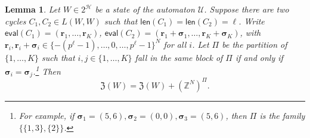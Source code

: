 \documentclass[letterpaper, 11pt, thm-restate]{article}
\numberwithin{equation}{section}
\newcommand{\Z}{\mathbb{Z}}
\newcommand{\mH}{\mathcal{H}}
\newcommand{\mZ}{\mathfrak{Z}}
\newcommand{\br}{\boldsymbol{r}}
\newcommand{\mmU}{\mathscr{U}}
\newcommand{\bsig}{\boldsymbol{\sigma}}
\newcommand{\len}{\mathsf{len}}
\newcommand{\eval}{\mathsf{eval}}
\newtheorem{lem}[thrm]{Lemma}
\theoremstyle{definition}
\theoremstyle{definition}
\theoremstyle{definition}
\begin{document}
\begin{lem}\label{lem:stablePi}
    Let $W \in 2^{\mH}$ be a state of the automaton $\mmU$.
    Suppose there are two cycles $C_1, C_2 \in L(W, W)$ such that $\len(C_1) = \len(C_2) = \ell$.
    Write $\eval(C_1) = (\br_1, \ldots, \br_K)$, $\eval(C_2) = (\br_1 + \bsig_{1}, \ldots, \br_K + \bsig_{K})$, with $\br_i, \br_i + \bsig_i \in \{-(p^{\ell} - 1), \ldots, 0, \ldots, p^{\ell} - 1\}^{N}$ for all $i$.
    Let $\Pi$ be the partition of $\{1, \ldots, K\}$ such that $i, j \in \{1, \ldots, K\}$ fall in the same block of $\Pi$ if and only if $\bsig_i = \bsig_j$.\footnote{For example, if $\bsig_1 = (5,6), \bsig_2 = (0, 0), \bsig_3 = (5, 6)$, then $\Pi$ is the family $\big\{\{1, 3\}, \{2\}\big\}$.}
    Then
    \begin{equation}\label{eq:stabletrans}
    \mZ(W) = \mZ(W) + (\Z^N)^{\Pi}.
    \end{equation}
\end{lem}
\end{document}
